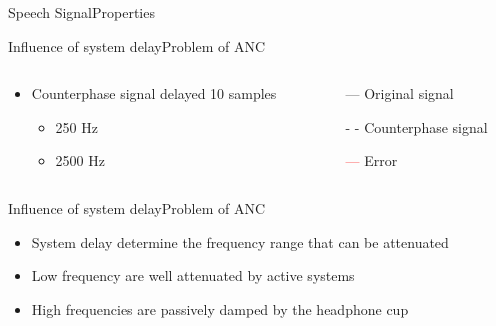 \begin{frame}{Speech Signal}{Properties}
\begin{frame}{Influence of system delay}{Problem of ANC}		
	\begin{columns}
		\begin{column}{0.5\textwidth}
			\begin{itemize}
				\item Counterphase signal delayed 10 samples	
				\begin{itemize}
					\item 250 Hz
					\item 2500 Hz 
				\end{itemize}	
			\end{itemize}
			\vspace{-6.5mm}			
		\begin{center}
	 		
	 	\end{center}
		\end{column}
		\begin{column}{0.5\textwidth} 
		\begin{itemize}
			\item[\textcolor{MATLABblue}{---}] Original signal
			\item[\textcolor{MATLABblue}{- -}] Counterphase signal
			\item[\textcolor{red}{---}] Error
		\end{itemize}
		\begin{center}
	 		
	 	\end{center}
		\end{column}
	\end{columns}
\end{frame}

\begin{frame}{Influence of system delay}{Problem of ANC}		
	\begin{center}
	\begin{itemize}
	\item System delay determine the frequency range that can be attenuated
	\item Low frequency are well attenuated by active systems
	\item High frequencies are passively damped by the headphone cup 
	\end{itemize}
	\end{center}
\end{frame}



\end{frame}
